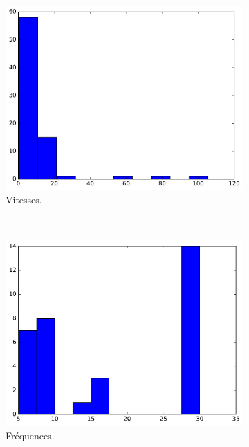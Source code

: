 \begin{appendices}
	\begin{figure}[htbp]
		\begin{subfigure}[t]{\subImgWclicks}
			\centering
			\includegraphics[width=\textwidth]{figures/annexe/bulletA_filteredSpeed}
			\caption{Vitesses.}
			\label{fig:bulletA_filteredSpeed}
		\end{subfigure}
		~
		\begin{subfigure}[t]{\subImgWclicks}
			\centering
			\includegraphics[width=\textwidth]{figures/annexe/bulletA_frequency}
			\caption{Fréquences.}
			\label{fig:bulletA_frequency}
		\end{subfigure}
		~
		\begin{subfigure}[t]{\subImgWclicks}

\end{subfigure}
\end{figure}
\end{appendices}
